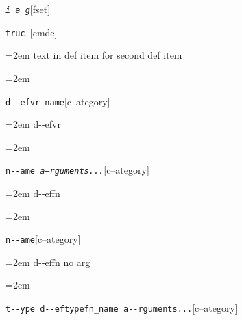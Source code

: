 \documentclass{book}
\begin{document}
\endgroup{}%
\noindent\texttt{\textsl{i} \EmbracOn{}\textnormal{\textsl{a g}}\EmbracOff{}}\hfill[fset]



%
\noindent\texttt{truc \EmbracOn{}\textnormal{\textsl{}}\EmbracOff{}}\hfill[cmde]



%
\par\begingroup\obeylines\obeyspaces\frenchspacing\leftskip=2em\relax\parskip=0pt\relax\ttfamily{}%
text in def item for second def item
\endgroup{}%
\par\begingroup\obeylines\obeyspaces\frenchspacing\leftskip=2em\relax\parskip=0pt\relax\ttfamily{}%


\endgroup{}%
\noindent\texttt{d{-}{-}efvr\_name}\hfill[c--ategory]



%
\par\begingroup\obeylines\obeyspaces\frenchspacing\leftskip=2em\relax\parskip=0pt\relax\ttfamily{}%
d{-}{-}efvr
\endgroup{}%
\par\begingroup\obeylines\obeyspaces\frenchspacing\leftskip=2em\relax\parskip=0pt\relax\ttfamily{}%

\endgroup{}%
\noindent\texttt{n{-}{-}ame \EmbracOn{}\textnormal{\textsl{a--rguments...}}\EmbracOff{}}\hfill[c--ategory]



%
\par\begingroup\obeylines\obeyspaces\frenchspacing\leftskip=2em\relax\parskip=0pt\relax\ttfamily{}%
d{-}{-}effn
\endgroup{}%
\par\begingroup\obeylines\obeyspaces\frenchspacing\leftskip=2em\relax\parskip=0pt\relax\ttfamily{}%

\endgroup{}%
\noindent\texttt{n{-}{-}ame}\hfill[c--ategory]



%
\par\begingroup\obeylines\obeyspaces\frenchspacing\leftskip=2em\relax\parskip=0pt\relax\ttfamily{}%
d{-}{-}effn no arg
\endgroup{}%
\par\begingroup\obeylines\obeyspaces\frenchspacing\leftskip=2em\relax\parskip=0pt\relax\ttfamily{}%

\endgroup{}%
\noindent\texttt{t{-}{-}ype d{-}{-}eftypefn\_name a{-}{-}rguments...}\hfill[c--ategory]
\end{document}
